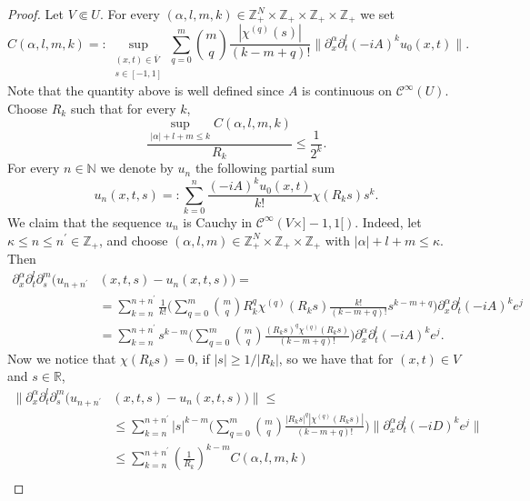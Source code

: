 \documentclass[11pt]{amsart}
\theoremstyle{definition}
\theoremstyle{remark}
\theoremstyle{plain}
\begin{document}
\begin{proof}
Let $V \Subset U$. For every $(\alpha, l, m, k) \in \mathbb{Z}_+^N \times \mathbb{Z}_+ \times \mathbb{Z}_+ \times \mathbb{Z}_+$ we set
%
\begin{equation}
	C(\alpha, l, m, k) =: \sup_{\substack{(x,t) \in \overline{V} \\ s \in [-1,1]}} \sum_{q = 0}^m \binom{m}{q} \frac{|\chi^{(q)}(s)|}{(k-m+q)!} \|\partial_x^\alpha \partial_t^l(-iA)^k u_0(x,t) \|.
\end{equation}
%
Note that the quantity above is well defined since $A$ is continuous on $\mathcal{C}^\infty(U)$. Choose $R_k$ such that for every $k$, 
%
\begin{equation}
	\frac{\sup_{|\alpha|+l+m \leq k}C(\alpha, l, m, k)}{R_k} \leq \frac{1}{2^k}.
\end{equation}
%
For every $n \in \mathbb{N}$ we denote by $u_n$ the following partial sum
%
\begin{equation*}
	u_n(x,t,s) =: \sum_{k = 0}^n \frac{(-iA)^ku_0(x,t)}{k!}\chi(R_k s)s^k.
\end{equation*}
%
We claim that the sequence $u_n$ is Cauchy in $\mathcal{C}^\infty(V\times]-1,1[)$. Indeed, let $\kappa \leq n \leq  n^\prime \in \mathbb{Z}_+$, and choose $(\alpha, l, m) \in \mathbb{Z}_+^N \times \mathbb{Z}_+ \times \mathbb{Z}_+$ with $|\alpha| + l + m \leq \kappa $.
Then
%
\begin{align*}
	\partial_x^\alpha \partial_t^l \partial_s^m (u_{n+n^\prime}&(x,t,s) - u_n(x,t,s))  = \\
	&= \sum_{k=n}^{n + n^\prime} \frac{1}{k!} \bigg(\sum_{q=0}^m \binom{m}{q} R_k^q \chi^{(q)}(R_k s) \frac{k!}{(k-m+q)!} s^{k-m+q} \bigg) \partial_x^\alpha \partial_t^l (-iA)^k e^j \\
	& = \sum_{k=n}^{n + n^\prime} s^{k-m} \bigg(\sum_{q=0}^m \binom{m}{q} \frac{(R_k s)^q \chi^{(q)}(R_k s)}{(k-m+q)!} \bigg) \partial_x^\alpha \partial_t^l (-iA)^k e^j.
\end{align*}	 
%
Now we notice that $\chi(R_k s) = 0$, if $|s| \geq 1/|R_k|$, so we have that for $(x,t) \in V$ and $s \in \mathbb{R}$,
%
\begin{align*}
	\big\| \partial_x^\alpha \partial_t^l \partial_s^m (u_{n+n^\prime}&(x,t,s) - u_n(x,t,s)) \big\| \leq \\
	& \leq \sum_{k=n}^{n + n^\prime} |s|^{k-m} \bigg(\sum_{q=0}^m \binom{m}{q} \frac{|R_k s|^q |\chi^{(q)}(R_k s)|}{(k-m+q)!} \bigg) \|\partial_x^\alpha \partial_t^l (-iD)^k e^j \| \\
	& \leq \sum_{k=n}^{n + n^\prime} \left(\frac{1}{R_k} \right)^{k-m} C(\alpha, l, m, k) \\

\end{align*}
\end{proof}
\end{document}
